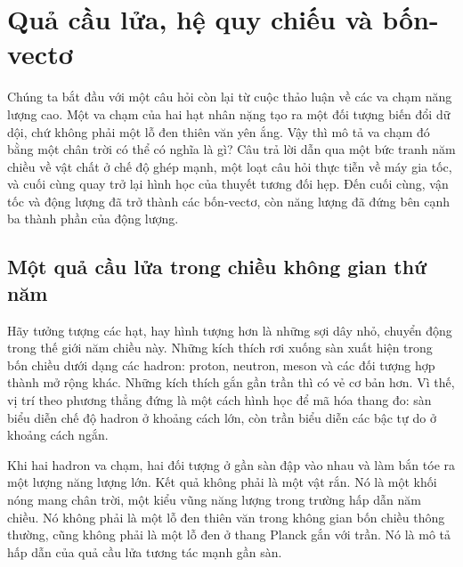 \chapter{Quả cầu lửa, hệ quy chiếu và bốn-vectơ}

Chúng ta bắt đầu với một câu hỏi còn lại từ cuộc thảo luận về các va chạm năng lượng cao. Một va chạm của hai hạt nhân nặng tạo ra một đối tượng biến đổi dữ dội, chứ không phải một lỗ đen thiên văn yên ắng. Vậy thì mô tả va chạm đó bằng một chân trời có thể có nghĩa là gì? Câu trả lời dẫn qua một bức tranh năm chiều về vật chất ở chế độ ghép mạnh, một loạt câu hỏi thực tiễn về máy gia tốc, và cuối cùng quay trở lại hình học của thuyết tương đối hẹp. Đến cuối cùng, vận tốc và động lượng đã trở thành các bốn-vectơ, còn năng lượng đã đứng bên cạnh ba thành phần của động lượng.

\section{Một quả cầu lửa trong chiều không gian thứ năm}

\begin{classroomqa}
\end{classroomqa}

Hãy tưởng tượng các hạt, hay hình tượng hơn là những sợi dây nhỏ, chuyển động trong thế giới năm chiều này. Những kích thích rơi xuống sàn xuất hiện trong bốn chiều dưới dạng các hadron: proton, neutron, meson và các đối tượng hợp thành mở rộng khác. Những kích thích gắn gần trần thì có vẻ cơ bản hơn. Vì thế, vị trí theo phương thẳng đứng là một cách hình học để mã hóa thang đo: sàn biểu diễn chế độ hadron ở khoảng cách lớn, còn trần biểu diễn các bậc tự do ở khoảng cách ngắn.

Khi hai hadron va chạm, hai đối tượng ở gần sàn đập vào nhau và làm bắn tóe ra một lượng năng lượng lớn. Kết quả không phải là một vật rắn. Nó là một khối nóng mang chân trời, một kiểu vũng năng lượng trong trường hấp dẫn năm chiều. Nó không phải là một lỗ đen thiên văn trong không gian bốn chiều thông thường, cũng không phải là một lỗ đen ở thang Planck gắn với trần. Nó là mô tả hấp dẫn của quả cầu lửa tương tác mạnh gần sàn.

